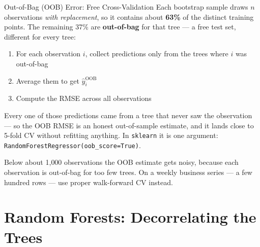 \documentclass[aspectratio=169, 11pt]{beamer}
\begin{document}
\begin{frame}{Out-of-Bag (OOB) Error: Free Cross-Validation}
  Each bootstrap sample draws $n$ observations \emph{with replacement}, so it contains about
  \textbf{63\%} of the distinct training points. The remaining 37\% are \textbf{out-of-bag}
  for that tree --- a free test set, different for every tree:
  \begin{enumerate}\small\itemsep0pt
    \item For each observation $i$, collect predictions only from the trees where $i$ was
          out-of-bag
    \item Average them to get $\hat{y}_i^{\text{OOB}}$
    \item Compute the RMSE across all observations
  \end{enumerate}

  \vspace{0.1cm}
  Every one of those predictions came from a tree that never saw the observation --- so the
  OOB RMSE is an honest out-of-sample estimate, and it lands close to 5-fold CV without
  refitting anything. In \texttt{sklearn} it is one argument:
  \texttt{RandomForestRegressor(oob\_score=True)}.
  \begin{warningbox}
    Below about 1{,}000 observations the OOB estimate gets noisy, because each observation is
    out-of-bag for too few trees. On a weekly business series --- a few hundred rows --- use
    proper walk-forward CV instead.
  \end{warningbox}
\end{frame}

\section{Random Forests: Decorrelating the Trees}

\end{document}

